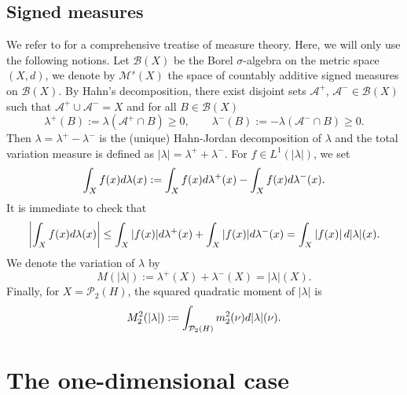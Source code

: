 \documentclass[12pt,a4paper]{article}
\renewcommand{\d}{{\rm d}}
\newcommand{\X}{\mathcal{P}_2(H)}
\theoremstyle{plain}
\theoremstyle{definition}
\begin{document}
\subsection{Signed measures}
We refer to \cite{bogachev} for a comprehensive treatise of measure theory. Here, we will only use the following notions. Let $\mathcal B(X)$ be the Borel $\sigma$-algebra on the metric space $(X,d)$,  we denote by $\mathcal M^s(X)$ the space of countably additive signed measures on $\mathcal B(X)$. By Hahn's decomposition, there exist disjoint sets $\mathcal{A}^+$, $\mathcal{A}^- \in \mathcal B(X)$ such that  $\mathcal{A}^+ \cup \mathcal{A}^- =X$ and for all $B\in \mathcal{B}(X)$
\[	
	\lambda^+(B) :=\lambda(\mathcal{A}^+ \cap B) \geq 0,\qquad \lambda^-(B):=-\lambda(\mathcal{A}^- \cap B) \geq 0.
\]
Then $\lambda = \lambda^+ - \lambda^-$ is the (unique) Hahn-Jordan decomposition of $\lambda$ and the total variation measure is defined as $|\lambda|=\lambda^+ +\lambda^-$. For $f\in L^1(|\lambda|)$, we set
\[	
	\int_X f(x)\d\lambda(x) :=  	\int_X f(x)\d\lambda^+(x)  -	\int_X f(x)\d\lambda^-(x) .
\]
It is immediate to check that
\begin{equation}
\label{eq:signed_ineq}
	\left|\int_X f(x)\d\lambda(x)\right| \leq  	\int_X |f(x)|\d\lambda^+(x)  +	\int_X |f(x)|\d\lambda^-(x) = \int_X |f(x)|\,\d|\lambda|(x).
\end{equation}
We denote the variation of $\lambda$ by
\begin{equation}
\label{def:M}
	M(|\lambda|):= \lambda^+(X) +\lambda^-(X) = |\lambda|(X).
\end{equation}
Finally, for $X=\X$, the squared quadratic moment of $|\lambda|$ is 
\begin{equation}
\label{def:M2}
	M^2_2(|\lambda|):= \int_{\X}  m_2^2(\nu)\d|\lambda|(\nu).
\end{equation}






\section{The one-dimensional case}
\label{sec:one}
\end{document}
